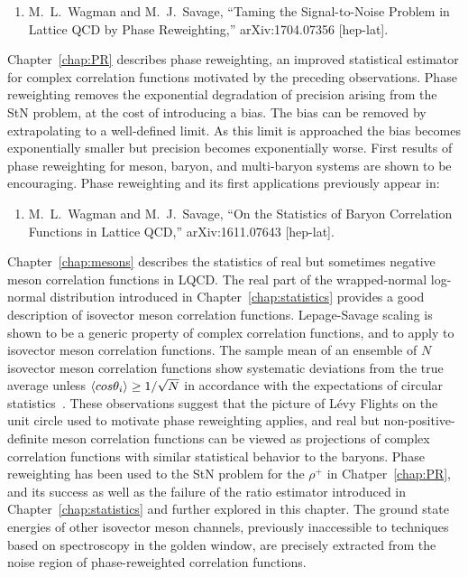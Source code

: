 \begin{enumerate}
\item M.~L.~Wagman and M.~J.~Savage, ``Taming the Signal-to-Noise Problem in Lattice QCD by Phase Reweighting,'' arXiv:1704.07356 [hep-lat].
\end{enumerate}

Chapter~\ref{chap:PR} describes phase reweighting, an improved statistical estimator for complex correlation functions
motivated by the preceding observations.
Phase reweighting removes the exponential degradation of precision arising from the StN problem,
at the cost of introducing a bias.
The bias can be removed by extrapolating to a well-defined limit.
As this limit is approached the bias becomes exponentially smaller but precision becomes exponentially worse.
First results of phase reweighting for meson, baryon, and multi-baryon systems are shown to be encouraging.
Phase reweighting and its first applications previously appear in:

\begin{enumerate}
\item M.~L.~Wagman and M.~J.~Savage, ``On the Statistics of Baryon Correlation Functions in Lattice QCD,'' arXiv:1611.07643 [hep-lat].
\end{enumerate}


Chapter~\ref{chap:mesons} describes the statistics of real but sometimes negative meson correlation functions in LQCD.
The real part of the wrapped-normal log-normal distribution introduced in Chapter~\ref{chap:statistics} provides a good description of isovector meson correlation functions.
Lepage-Savage scaling is shown to be a generic property of complex correlation functions, and to apply to isovector meson correlation functions.
The sample mean of an ensemble of $N$ isovector meson correlation functions show systematic deviations from the true average unless $\left< cos \theta_i \right> \geq 1/\sqrt{N}$ in accordance with the expectations of circular statistics~\cite{Fisher:1995}.
These observations suggest that the picture of L{\'e}vy Flights on the unit circle used to motivate phase reweighting applies, and real but non-positive-definite meson correlation functions can be viewed as projections of complex correlation functions with similar statistical behavior to the baryons.
Phase reweighting has been used to the StN problem for the $\rho^+$ in Chatper~\ref{chap:PR}, and its success as well as the failure of the ratio estimator introduced in Chapter~\ref{chap:statistics} and further explored in this chapter.
The ground state energies of other isovector meson channels, previously inaccessible to techniques based on spectroscopy in the golden window, are precisely extracted from the noise region of phase-reweighted correlation functions.

